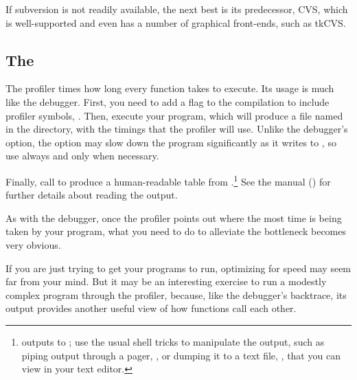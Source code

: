 If subversion is not readily available, the next best is its predecessor,
CVS, which is well-supported and even has a number of graphical
front-ends, such as tkCVS.  

\subsection{The } The profiler times how long every function
takes to execute. Its usage is much like the debugger. First, you need
to add a flag to the compilation to include profiler symbols,
. Then, execute your program, which will produce a file named
 in the directory, with the timings that the profiler
will use. Unlike the debugger's  option, the 
option may slow down the program significantly as it writes to
, so use  always and  only
when necessary.

Finally, call  to produce a
human-readable table from .\footnote{
outputs to ; use the usual shell tricks to manipulate
the output, such as piping output through a pager, , or dumping it to a text file, , that you can view in your text editor.}
See the manual () for further details about reading
the output.

As with the debugger, once the profiler points out where the most time
is being taken by your program, what you need to do to alleviate the
bottleneck becomes very obvious.

If you are just trying to get your programs to run, optimizing for speed 
may seem far from your mind. But it may be an interesting exercise to
run a modestly complex program through the profiler, because, like the
debugger's backtrace, its output provides another useful view of how
functions call each other.




